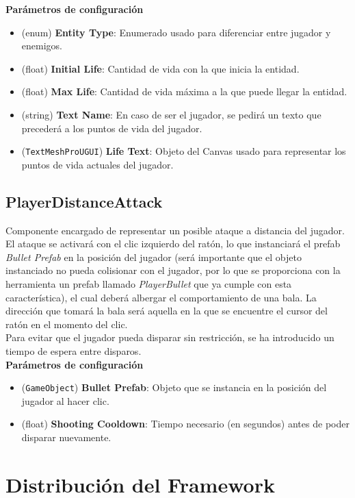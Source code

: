 \textbf{Parámetros de configuración}
\begin{itemize}
	\item (enum) \textbf{Entity Type}: Enumerado usado para diferenciar entre jugador y enemigos.
	\item (float) \textbf{Initial Life}: Cantidad de vida con la que inicia la entidad.
	\item (float) \textbf{Max Life}: Cantidad de vida máxima a la que puede llegar la entidad.
	\item (string) \textbf{Text Name}: En caso de ser el jugador, se pedirá un texto que precederá a los puntos de vida del jugador.
	\item (\texttt{TextMeshProUGUI}) \textbf{Life Text}: Objeto del Canvas usado para representar los puntos de vida actuales del jugador.
\end{itemize}

\subsection{PlayerDistanceAttack}

Componente encargado de representar un posible ataque a distancia del jugador. El ataque se activará con el clic izquierdo del ratón, lo que instanciará el prefab \textit{Bullet Prefab} en la posición del jugador (será importante que el objeto instanciado no pueda colisionar con el jugador, por lo que se proporciona con la herramienta un prefab llamado \textit{PlayerBullet} que ya cumple con esta característica), el cual deberá albergar el comportamiento de una bala. La dirección que tomará la bala será aquella en la que se encuentre el cursor del ratón en el momento del clic.\\

Para evitar que el jugador pueda disparar sin restricción, se ha introducido un tiempo de espera entre disparos.\\

\textbf{Parámetros de configuración}
\begin{itemize}
	\item (\texttt{GameObject}) \textbf{Bullet Prefab}: Objeto que se instancia en la posición del jugador al hacer clic.
	\item (float) \textbf{Shooting Cooldown}: Tiempo necesario (en segundos) antes de poder disparar nuevamente.
\end{itemize}

\section {Distribución del Framework}

